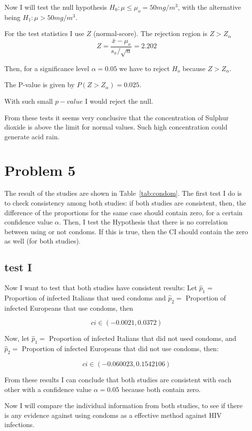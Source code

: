 \documentclass[10pt]{article}
\begin{document}
Now I will test the null hypothesis $H_0 :\mu \leq \mu_o=50mg/m^3$, with the alternative being $H_1: \mu> 50mg/m^3$.
 
For the test statistics I use $Z$ (normal-score). The rejection region is $Z > Z_\alpha$ 
\[
Z = \frac{\bar{x}-\mu_o}{s_x/\sqrt{n}} = 2.202 
\]

Then, for a significance level $\alpha=0.05$ we have to reject $H_o$ because $Z > Z_\alpha$.

The P-value is given by $P(Z > Z_{\alpha} ) = 0.025$.

With such small $p-value$ I would reject the null.

From these tests it seems very conclusive that the concentration of Sulphur dioxide is 
above the limit for normal values. Such high concentration could generate acid rain.

\section{Problem 5}
The result of the studies are shown in Table~\ref{tab:condom}.
The first test I do is to check consistency among both studies: if both studies are
consistent, then, the difference of the proportions for the same case should contain 
zero, for a certain confidence value $\alpha$. Then, I test the Hypothesis that
there is no correlation between using or not condoms. If this is true, then the CI
should contain the zero as well (for both studies).

\subsection{test I}
Now I want to test that both studies have consistent results:
Let $\hat{p}_1 =$ Proportion of infected Italians that used condoms and
$\hat{p}_2 =$ Proportion of infected Europeans that use condoms, then

\[
ci \in (-0.0021, 0.0372)
\]

Now, let $\hat{p}_1 =$ Proportion of infected Italians that did not used condoms,
and $\hat{p}_2 =$ Proportion of infected Europeans that did not use condoms, then:

\[
ci \in (-0.060023, 0.1542106)
\]

From these results I can conclude that both studies are consistent with each other
with a confidence value $\alpha=0.05$ because both contain zero. 

Now I will compare the individual information from both studies, to see if there 
is any evidence against using condoms as a effective method against HIV infections.
\end{document}
